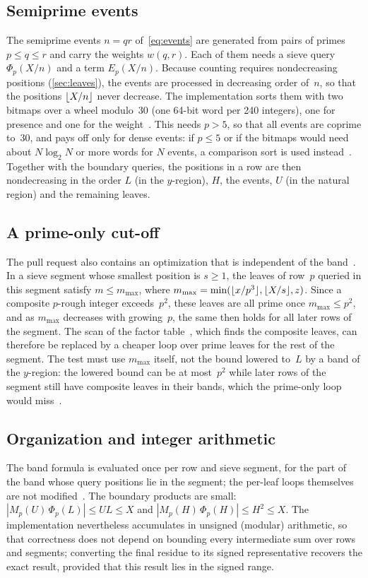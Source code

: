 \documentclass[11pt,a4paper]{amsart}
\numberwithin{equation}{section}
\DeclarePairedDelimiter{\floor}{\lfloor}{\rfloor}
\begin{document}
\subsection{Semiprime events}\label{sec:events}
The semiprime events $n=qr$ of~\eqref{eq:events} are generated from pairs of
primes $p\le q\le r$ and carry the weights $w(q,r)$. Each of them needs a sieve
query $\Phi_p(X/n)$ and a term $E_p(X/n)$. Because counting requires
nondecreasing positions (\cref{sec:leaves}), the events are processed in
decreasing order of~$n$, so that the positions $\floor{X/n}$ never decrease. The
implementation sorts them with two bitmaps over a wheel modulo~$30$ (one 64-bit
word per 240 integers), one for presence and one for the
weight~\cite[\S8]{Lin2026}. This needs $p>5$, so that all events are coprime
to~$30$, and pays off only for dense events: if $p\le5$ or if the bitmaps would
need about $N\log_2N$ or more words for $N$ events, a comparison sort is used
instead~\cite{PR146}. Together
with the boundary queries, the positions in a row are then nondecreasing in the order
$L$ (in the $y$-region), $H$, the events, $U$ (in the natural region) and the
remaining leaves.

\subsection{A prime-only cut-off}\label{sec:cutoff}
The pull request also contains an optimization that is independent of the
band~\cite[\S7]{Lin2026}. In a sieve segment whose smallest position is $s\ge1$,
the leaves of row~$p$ queried in this segment satisfy $m\le m_{\max}$, where
$m_{\max}=\min(\floor{x/p^3},\floor{X/s},z)$. Since a composite $p$-rough
integer exceeds~$p^2$, these leaves are all prime once $m_{\max}\le p^2$, and as
$m_{\max}$ decreases with growing~$p$, the same then holds for all later rows of
the segment. The scan of the factor table~\cite{Walisch2026simd}, which finds the
composite leaves, can therefore be replaced by a cheaper loop over prime leaves
for the rest of the segment. The test must use $m_{\max}$ itself, not the bound
lowered to~$L$ by a band of the $y$-region: the lowered bound can be at
most~$p^2$ while later rows of the segment still have composite leaves in their
bands, which the prime-only loop would miss~\cite[Table~5]{Lin2026}.

\subsection{Organization and integer arithmetic}\label{sec:arith}
The band formula is evaluated once per row and sieve segment, for the part of
the band whose query positions lie in the segment; the per-leaf loops
themselves are not modified~\cite{PR146}. The boundary products are small:
$|M_p(U)\,\Phi_p(L)|\le UL\le X$ and $|M_p(H)\,\Phi_p(H)|\le H^2\le X$. The
implementation nevertheless accumulates in unsigned (modular) arithmetic, so
that correctness does not depend on bounding every intermediate sum over rows
and segments; converting the final residue to its signed representative
recovers the exact result, provided that this result lies in the signed range.
\end{document}
